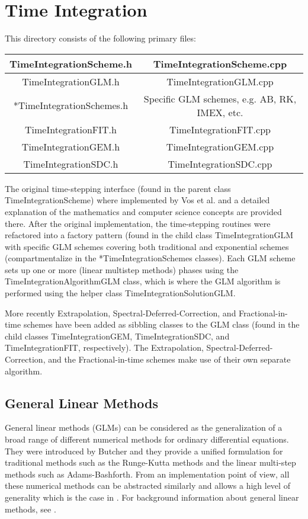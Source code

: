 %
\section{Time Integration}

This directory consists of the following primary files:

\begin{center}
\begin{tabular}{|c | c | } \hline
TimeIntegrationScheme.h & TimeIntegrationScheme.cpp \\ \hline 
TimeIntegrationGLM.h & TimeIntegrationGLM.cpp \\ \hline
*TimeIntegrationSchemes.h & Specific GLM schemes, e.g. AB, RK, IMEX, etc. \\ \hline
TimeIntegrationFIT.h & TimeIntegrationFIT.cpp \\ \hline
TimeIntegrationGEM.h & TimeIntegrationGEM.cpp \\ \hline
TimeIntegrationSDC.h & TimeIntegrationSDC.cpp \\ \hline
\end{tabular}
\end{center}

The original time-stepping interface (found in the parent class
TimeIntegrationScheme) where implemented by Vos et al. \cite{Vostime}
and a detailed explanation of the mathematics and computer science
concepts are provided there.  After the original implementation, the
time-stepping routines were refactored into a factory pattern (found
in the child class TimeIntegrationGLM with specific GLM schemes
covering both traditional and exponential schemes (compartmentalize in
the *TimeIntegrationSchemes classes). Each GLM scheme sets up one or
more (linear multistep methods) phases using the
TimeIntegrationAlgorithmGLM class, which is where the GLM algorithm is
performed using the helper class TimeIntegrationSolutionGLM.

More recently Extrapolation, Spectral-Deferred-Correction, and 
Fractional-in-time schemes have been added as sibbling classes to the 
GLM class (found in the child classes
TimeIntegrationGEM, TimeIntegrationSDC, and TimeIntegrationFIT, 
respectively). The Extrapolation, Spectral-Deferred-Correction, and 
the Fractional-in-time schemes make use of their own separate algorithm.


\subsection{General Linear Methods}
\label{subsectionGeneralLinearMethods}
General linear methods (GLMs) can be considered as the generalization
of a broad range of different numerical methods for ordinary
differential equations.  They were introduced by Butcher and they
provide a unified formulation for traditional methods such as the
Runge-Kutta methods and the linear multi-step methods such as
Adams-Bashforth.  From an implementation point of view, all these
numerical methods can be abstracted similarly and allows a high level
of generality which is the case in {\nek}. For background information
about general linear methods, see \cite{Bu06}.

